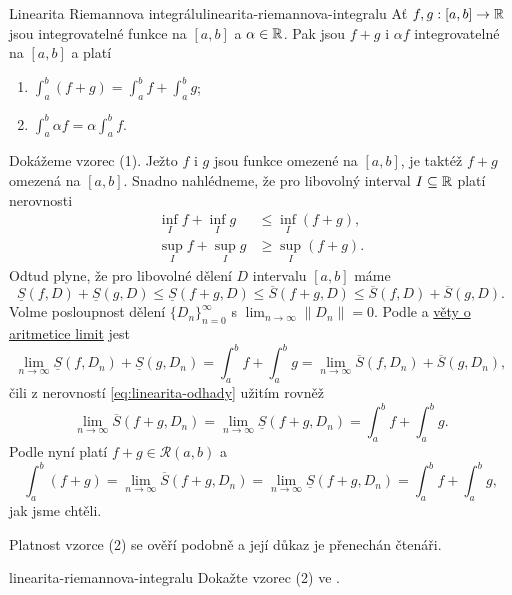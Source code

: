 \begin{theorem}{Linearita Riemannova integrálu}{linearita-riemannova-integralu}
 Ať $f,g:[a,b] \to \mathbb{R}$ jsou integrovatelné funkce na $[a,b]$ a $\alpha \in \mathbb{R}$.
 Pak jsou $f + g$ i $\alpha f$ integrovatelné na $[a,b]$ a platí
 \begin{enumerate}
  \item $\int_{a}^{b} (f + g) = \int_{a}^{b} f + \int_{a}^{b} g$;
  \item $\int_{a}^{b} \alpha f = \alpha \int_{a}^{b} f$.
 \end{enumerate}
\end{theorem}
\begin{thmproof}
 Dokážeme vzorec (1). Ježto $f$ i $g$ jsou funkce omezené na $[a,b]$, je taktéž
 $f+g$ omezená na $[a,b]$. Snadno nahlédneme, že pro libovolný interval $I
 \subseteq \mathbb{R}$ platí nerovnosti
 \begin{align*}
  \inf_I f + \inf_I g & \leq \inf_I (f + g),\\
  \sup_I f + \sup_I g & \geq \sup_I (f + g).
 \end{align*}
 Odtud plyne, že pro libovolné dělení $D$ intervalu $[a,b]$ máme
 \begin{equation}
  \label{eq:linearita-odhady}
  \underline{S}(f,D) + \underline{S}(g,D) \leq \underline{S}(f+g,D) \leq
  \overline{S}(f+g,D) \leq \overline{S}(f,D) + \overline{S}(g,D).
 \end{equation}
 Volme posloupnost dělení $\{D_n\}_{n=0}^{\infty}$ s $\lim_{n \to \infty}
 \|D_n\| = 0$. Podle  a
 \hyperref[thm:aritmetika-limit-funkci]{věty o aritmetice limit} jest
 \[
  \lim_{n \to \infty} \underline{S}(f,D_n) + \underline{S}(g,D_n) = \int_{a}^{b}
  f + \int_{a}^{b} g = \lim_{n \to \infty} \overline{S}(f,D_n) +
  \overline{S}(g,D_n),
 \]
 čili z nerovností \eqref{eq:linearita-odhady} užitím
  rovněž
 \[
  \lim_{n \to \infty} \overline{S}(f + g,D_n) = \lim_{n \to \infty}
  \underline{S}(f+g,D_n) = \int_{a}^{b} f + \int_{a}^{b} g.
 \]
 Podle  nyní platí $f + g \in
 \mathcal{R}(a,b)$ a
 \[
  \int_{a}^{b} (f + g) = \lim_{n \to \infty} \overline{S}(f+g,D_n) = \lim_{n \to
  \infty} \underline{S}(f+g,D_n) = \int_{a}^{b} f + \int_{a}^{b} g,
 \]
 jak jsme chtěli.

 Platnost vzorce (2) se ověří podobně a její důkaz je přenechán čtenáři.
\end{thmproof}

\begin{exercise}{}{linearita-riemannova-integralu}
 Dokažte vzorec (2) ve .
\end{exercise}

